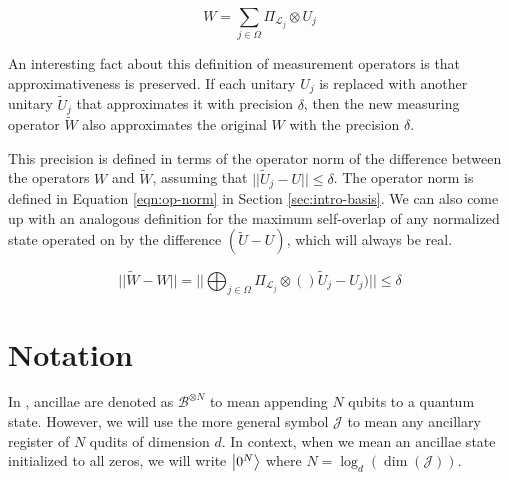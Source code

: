 \begin{equation}
W = \sum_{j \in \Omega} \Pi_{\mathcal{L}_j} \otimes U_j
\end{equation}

An interesting fact about this definition of measurement operators is
that approximativeness is preserved. If each unitary $U_j$ is replaced with
another unitary $\tilde{U}_j$ that approximates it with precision $\delta$,
then the new measuring operator $\tilde{W}$ also approximates the original
$W$ with the precision $\delta$.

This precision is defined in terms of the operator norm of the difference
between the operators $W$ and $\tilde{W}$, assuming that
$|| \tilde{U}_j - U || \le \delta$. The operator norm is
defined in Equation \ref{eqn:op-norm} in Section \ref{sec:intro-basis}.
We can also come up with an analogous definition for the
maximum
self-overlap of any normalized state operated on by the difference
$(\tilde{U} - U)$, which will always be real. 

\begin{equation}
|| \tilde{W} - W || = || \bigoplus_{j \in \Omega} \Pi_{\mathcal{L}_j} \otimes () \tilde{U}_j - U_j ) || \le \delta
\label{eqn:op-diff}
\end{equation}

\section{Notation}
\label{sec:meas-notation}

In \cite{Kitaev2002}, ancillae are denoted as $\mathcal{B}^{\otimes N}$ to mean
appending $N$ qubits to a quantum state. However, we will use the more general
symbol $\mathcal{J}$ to mean any ancillary register of $N$ qudits of dimension $d$.
In context,
when we mean an ancillae state initialized to all zeros, we will write
$\left\vert{0^N}\right\rangle$ where $N = \log_d(\dim(\mathcal{J}))$.

